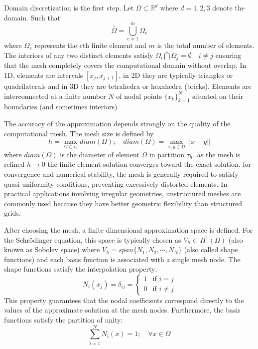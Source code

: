 \documentclass[11pt]{article}
\begin{document}
Domain discretization is the first step. Let $\Omega \subset \mathbb{R}^d$ where $d=1,2,3$ denote the domain. Such that
\begin{equation}
	\bar{\Omega} = \bigcup_{e=1}^{m} \Omega_e
\end{equation}
where $\Omega_e$ represents the $e$th finite element and $m$ is the total number of elements. The interiors of any two distinct elements satisfy $\Omega_i \bigcap \Omega_j = \emptyset \quad i \neq j$ ensuring that the mesh completely covers the computational domain without overlap.  In 1D, elements are intervals $[ x_j, x_{j+1}]$, in 2D they are typically triangles or quadrilaterals and in 3D they are tetrahedra or hexahedra (bricks). Elements are interconnected at a finite number $N$ of nodal points $ \{ x_k \}_{k = 1}^N$ situated on their boundaries (and sometimes interiors)

The accuracy of the approximation depends strongly on the quality of the computational mesh. The mesh size is defined by 
\begin{equation}
	h = \max_{\Omega \in \tau_h} diam(\Omega) ; \quad diam(\Omega) = \max_{x,y \in \Omega} || x - y ||
\end{equation}
where $diam(\Omega)$ is the diameter  of element $\Omega$ in partition $\tau_h$. as the mesh is refined $h \to 0$ the finite element solution converges toward the exact solution. for convergence and numerical stability, the mesh is generally required to satisfy quasi-uniformity conditions, preventing excessively distorted elements. In practical applications involving irregular geometries, unstructured meshes are commonly used because they have better geometric flexibility than structured grids.

After choosing the mesh, a finite-dimensional approximation space is defined. For the Schrödinger equation, this space is typically chosen as $V_h \subset H^1 (\Omega)$ (also known as Sobolev space) where $V_h = span \{ N_1, N_2, \cdots , N_N \}$ (also called shape functions) and each basis function is associated with a single mesh node.
The shape functions satisfy the interpolation property:
\begin{equation}
	N_i (x_j) = \delta_{ij} = 
		\begin{cases} 
		1 & \text{if } i = j \\
		0 & \text{if } i \neq j 
	\end{cases}
\end{equation}
This property guarantees that the nodal coefficients correspond directly to the values of the approximate solution at the mesh nodes. Furthermore, the basis functions satisfy the partition of unity:
\begin{equation}
	\sum_{i=1}^N N_i(x) = 1 ; \quad \forall x \in \Omega
\end{equation}
\end{document}
